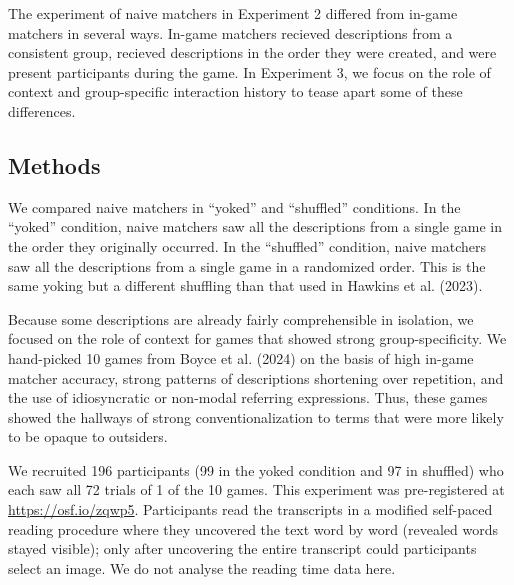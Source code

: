 \documentclass[10pt, letterpaper]{article}
\begin{document}
The experiment of naive matchers in Experiment 2 differed from in-game
matchers in several ways. In-game matchers recieved descriptions from a
consistent group, recieved descriptions in the order they were created,
and were present participants during the game. In Experiment 3, we focus
on the role of context and group-specific interaction history to tease
apart some of these differences.

\subsection{Methods}\label{methods-2}

We compared naive matchers in ``yoked'' and ``shuffled'' conditions. In
the ``yoked'' condition, naive matchers saw all the descriptions from a
single game in the order they originally occurred. In the ``shuffled''
condition, naive matchers saw all the descriptions from a single game in
a randomized order. This is the same yoking but a different shuffling
than that used in Hawkins et al. (2023).

Because some descriptions are already fairly comprehensible in
isolation, we focused on the role of context for games that showed
strong group-specificity. We hand-picked 10 games from Boyce et al.
(2024) on the basis of high in-game matcher accuracy, strong patterns of
descriptions shortening over repetition, and the use of idiosyncratic or
non-modal referring expressions. Thus, these games showed the hallways
of strong conventionalization to terms that were more likely to be
opaque to outsiders.

We recruited 196 participants (99 in the yoked condition and 97 in
shuffled) who each saw all 72 trials of 1 of the 10 games. This
experiment was pre-registered at \url{https://osf.io/zqwp5}.
Participants read the transcripts in a modified self-paced reading
procedure where they uncovered the text word by word (revealed words
stayed visible); only after uncovering the entire transcript could
participants select an image. We do not analyse the reading time data
here.
\end{document}
